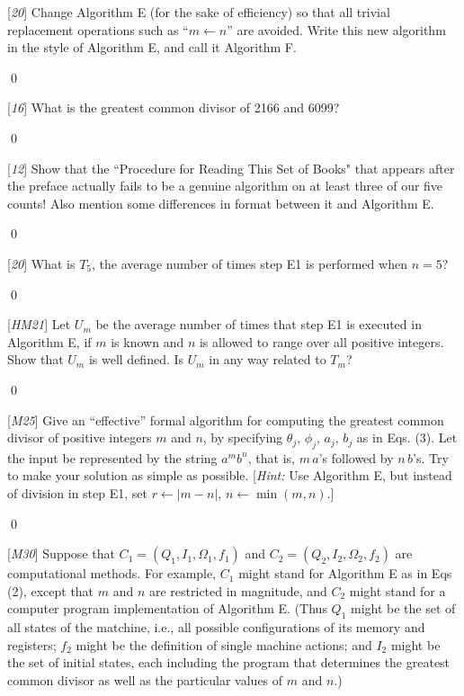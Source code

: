  [\textit{20}] Change Algorithm E (for the sake of efficiency) so that all trivial replacement operations such as ``$m \leftarrow n$'' are avoided. Write this new algorithm in the style of Algorithm E, and call it Algorithm F.

\sol \qed

 [\textit{16}] What is the greatest common divisor of 2166 and 6099?

\sol \qed

 [\textit{12}] Show that the ``Procedure for Reading This Set of Books" that appears after the preface actually fails to be a genuine algorithm on at least three of our five counts! Also mention some differences in format between it and Algorithm E.

\sol \qed

 [\textit{20}] What is $T_5$, the average number of times step E1 is performed when $n=5$?

\sol \qed

 [\textit{HM21}] Let $U_m$ be the average number of times that step E1 is executed in Algorithm E, if $m$ is known and $n$ is allowed to range over all positive integers. Show that $U_m$ is well defined. Is $U_m$ in any way related to $T_m$?

\sol \qed

 [\textit{M25}] Give an ``effective'' formal algorithm for computing the greatest common divisor of positive integers $m$ and $n$, by specifying $\theta_j, \, \phi_j, \, a_j, \, b_j$ as in Eqs. (3). Let the input be represented by the string $a^mb^n$, that is, $m \, a$'s followed by $n \, b$'s. Try to make your solution as simple as possible. [\textit{Hint:} Use Algorithm E, but instead of division in step E1, set $r \leftarrow |m - n|, \, n \leftarrow \min(m, n)$.]

\sol \qed

 [\textit{M30}] Suppose that $C_1 = (Q_1, I_1, \Omega_1, f_1)$ and $C_2 = (Q_2, I_2, \Omega_2, f_2)$ are computational methods. For example, $C_1$ might stand for Algorithm E as in Eqs (2), except that $m$ and $n$ are restricted in magnitude, and $C_2$ might stand for a computer program implementation of Algorithm E. (Thus $Q_1$ might be the set of all states of the matchine, i.e., all possible configurations of its memory and registers; $f_2$ might be the definition of single machine actions; and $I_2$ might be the set of initial states, each including the program that determines the greatest common divisor as well as the particular values of $m$ and $n$.)

